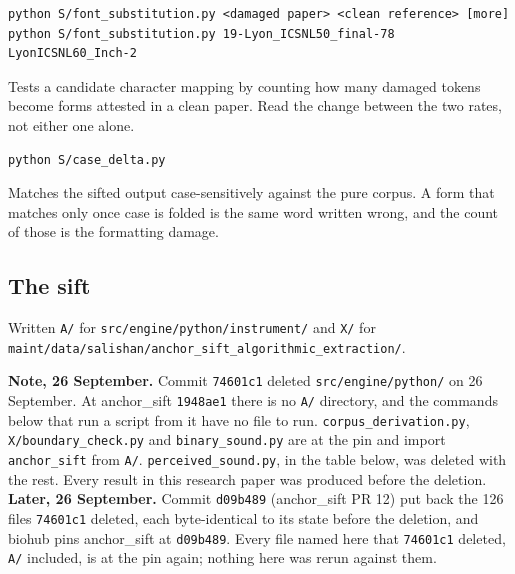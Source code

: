 \begin{lstlisting}[breaklines=true,breakatwhitespace=false,basicstyle=\ttfamily\small]
python S/font_substitution.py <damaged paper> <clean reference> [more]
python S/font_substitution.py 19-Lyon_ICSNL50_final-78 LyonICSNL60_Inch-2
\end{lstlisting}

Tests a candidate character mapping by counting how many damaged tokens become forms attested in a clean paper. Read the change between the two rates, not either one alone.

\begin{lstlisting}[breaklines=true,breakatwhitespace=false,basicstyle=\ttfamily\small]
python S/case_delta.py
\end{lstlisting}

Matches the sifted output case-sensitively against the pure corpus. A form that matches only once case is folded is the same word written wrong, and the count of those is the formatting damage.

\subsection{The sift}

Written \texttt{A/\allowbreak{}} for \texttt{src/\allowbreak{}engine/\allowbreak{}python/\allowbreak{}instrument/\allowbreak{}} and \texttt{X/\allowbreak{}} for \texttt{maint/\allowbreak{}data/\allowbreak{}salishan/\allowbreak{}anchor\_\allowbreak{}sift\_\allowbreak{}algorithmic\_\allowbreak{}extraction/\allowbreak{}}.

\textbf{Note, 26 September.} Commit \texttt{74601c1} deleted \texttt{src/\allowbreak{}engine/\allowbreak{}python/} on 26 September. At anchor\_sift \texttt{1948ae1} there is no \texttt{A/\allowbreak{}} directory, and the commands below that run a script from it have no file to run. \texttt{corpus\_\allowbreak{}derivation.\allowbreak{}py}, \texttt{X/\allowbreak{}boundary\_\allowbreak{}check.\allowbreak{}py} and \texttt{binary\_\allowbreak{}sound.\allowbreak{}py} are at the pin and import \texttt{anchor\_sift} from \texttt{A/\allowbreak{}}. \texttt{perceived\_\allowbreak{}sound.\allowbreak{}py}, in the table below, was deleted with the rest. Every result in this research paper was produced before the deletion. \textbf{Later, 26 September.} Commit \texttt{d09b489} (anchor\_sift PR 12) put back the 126 files \texttt{74601c1} deleted, each byte-identical to its state before the deletion, and biohub pins anchor\_sift at \texttt{d09b489}. Every file named here that \texttt{74601c1} deleted, \texttt{A/\allowbreak{}} included, is at the pin again; nothing here was rerun against them.


